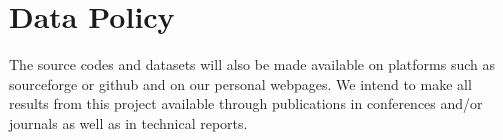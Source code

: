 \section{Data Policy}
\label{sec:data-policy}


The source codes and datasets will also be made available on platforms such as sourceforge or github and on our personal webpages. We intend to make all results from this project available through publications in conferences and/or journals as well as in technical reports.
